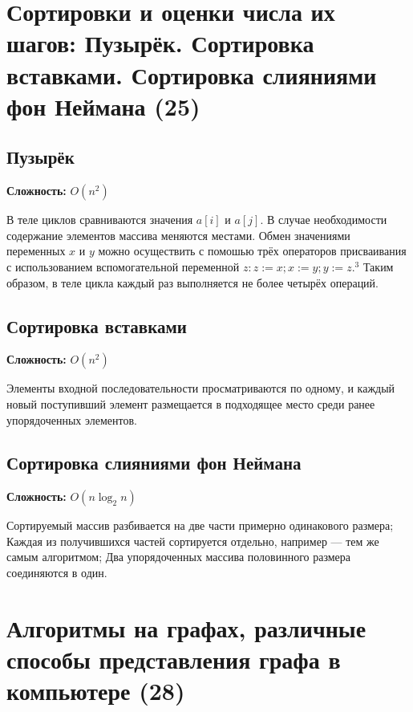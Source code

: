 \documentclass[40pt]{article}
\begin{document}
\section{Сортировки и оценки числа их шагов: Пузырёк. Сортировка вставками. Сортировка слияниями фон Неймана (25)}

\subsection{Пузырёк}

\textbf{Сложность:} $O(n^2)$

В теле циклов сравниваются значения $a[i]$ и $a[j]$. В случае необходимости содержание элементов массива меняются местами. Обмен значениями переменных $x$ и $y$ можно осуществить с помошью трёх операторов присваивания с использованием вспомогательной переменной $z: z:=x ; x:=y ; y:=z .^{3}$ Таким образом, в теле цикла каждый раз выполняется не более четырёх операций.


\subsection{Сортировка вставками}

\textbf{Сложность:} $O(n^2)$

Элементы входной последовательности просматриваются по одному, и каждый новый поступивший элемент размещается в подходящее место среди ранее упорядоченных элементов.

\subsection{Сортировка слияниями фон Неймана}

\textbf{Сложность:} $O(n \log_{2} n)$

Сортируемый массив разбивается на две части примерно одинакового размера; Каждая из получившихся частей сортируется отдельно, например — тем же самым алгоритмом; Два упорядоченных массива половинного размера соединяются в один.


\section{Алгоритмы на графах, различные способы представления графа в компьютере (28)}
\end{document}
